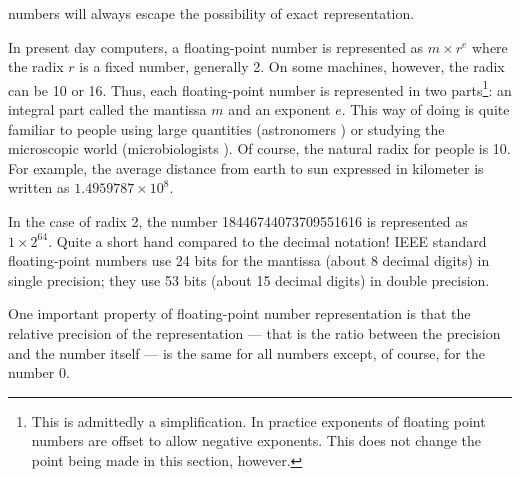 \documentclass[twoside]{book}
\begin{document}
numbers will always escape the possibility of exact
representation.
\par
In present day computers, a floating-point number is represented
as $m\times r^e$ where the radix $r$ is a fixed number, generally
2. On some machines, however, the radix can be 10 or 16. Thus,
each floating-point number is represented in two
parts\footnote{This is admittedly a simplification. In practice
exponents of floating point numbers are offset to allow negative
exponents. This does not change the point being made in this
section, however.}: an integral part called the mantissa $m$ and
an exponent $e$. This way of doing is quite familiar to people
using large quantities (astronomers \eg) or studying the
microscopic world (microbiologists \eg). Of course, the natural
radix for people is 10. For example, the average distance from
earth to sun expressed in kilometer is written as
$1.4959787\times10^8$.

In the case of radix 2, the number 18446744073709551616 is
represented as $1\times2^{64}$. Quite a short hand compared to the
decimal notation! IEEE standard floating-point numbers use 24 bits
for the mantissa (about 8 decimal digits) in single precision;
they use 53 bits (about 15 decimal digits) in double precision.
\par
One important property of floating-point number representation is
that the relative precision of the representation --- that is the
ratio between the precision and the number itself --- is the same
for all numbers except, of course, for the number 0.
\end{document}
